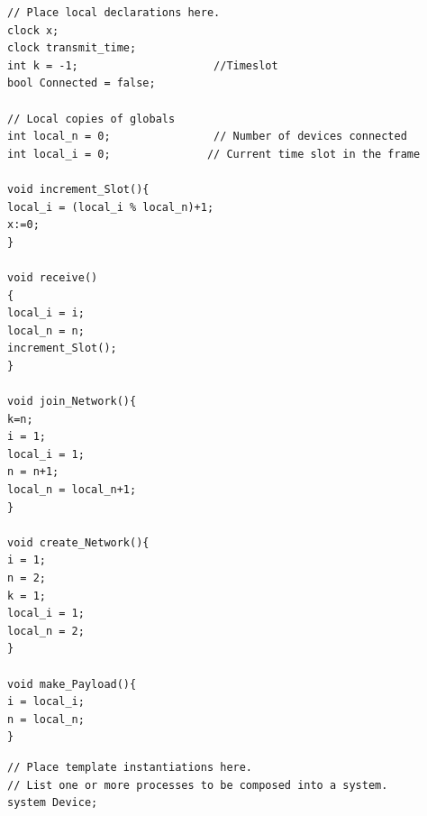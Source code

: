 \begin{lstlisting}[language={[GUI]Uppaal}, % use GUI flavor
columns={[l]flexible},
frameround=fftt, frame=shadowbox, rulesepcolor=\color{gray},
caption={Code for the local declarations for Device.}]
// Place local declarations here.
clock x;
clock transmit_time;
int k = -1;                     //Timeslot
bool Connected = false;

// Local copies of globals
int local_n = 0;                // Number of devices connected
int local_i = 0;               // Current time slot in the frame

void increment_Slot(){
local_i = (local_i % local_n)+1;
x:=0;
}

void receive()
{
local_i = i;
local_n = n;
increment_Slot();
}

void join_Network(){
k=n;
i = 1;
local_i = 1;
n = n+1;
local_n = local_n+1;
}

void create_Network(){
i = 1;
n = 2;
k = 1;
local_i = 1;
local_n = 2;
}

void make_Payload(){
i = local_i;
n = local_n;
}

\end{lstlisting}

\begin{lstlisting}[language={[GUI]Uppaal}, % use GUI flavor
columns={[l]flexible},
frameround=fftt, frame=shadowbox, rulesepcolor=\color{gray},
caption={Code for system declarations.}]
// Place template instantiations here.
// List one or more processes to be composed into a system.
system Device;
\end{lstlisting}